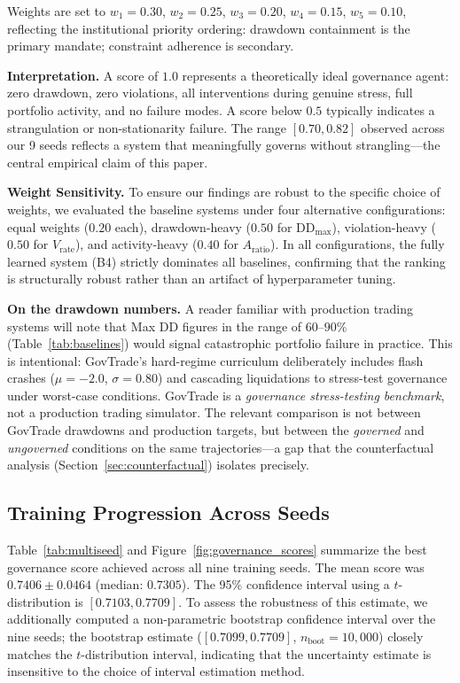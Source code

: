 \documentclass[11pt]{article}
\begin{document}
Weights are set to $w_1 = 0.30$, $w_2 = 0.25$, $w_3 = 0.20$, $w_4 = 0.15$, $w_5 = 0.10$, reflecting the institutional priority ordering: drawdown containment is the primary mandate; constraint adherence is secondary.

\textbf{Interpretation.} A score of $1.0$ represents a theoretically ideal governance agent: zero drawdown, zero violations, all interventions during genuine stress, full portfolio activity, and no failure modes. A score below $0.5$ typically indicates a strangulation or non-stationarity failure. The range $[0.70, 0.82]$ observed across our 9 seeds reflects a system that meaningfully governs without strangling---the central empirical claim of this paper.

\textbf{Weight Sensitivity.} To ensure our findings are robust to the specific choice of weights, we evaluated the baseline systems under four alternative configurations: equal weights ($0.20$ each), drawdown-heavy ($0.50$ for $\text{DD}_{\max}$), violation-heavy ($0.50$ for $V_{\text{rate}}$), and activity-heavy ($0.40$ for $A_{\text{ratio}}$). In all configurations, the fully learned system (B4) strictly dominates all baselines, confirming that the ranking is structurally robust rather than an artifact of hyperparameter tuning.

\textbf{On the drawdown numbers.} A reader familiar with production trading systems will note that Max DD figures in the range of $60$--$90\%$ (Table~\ref{tab:baselines}) would signal catastrophic portfolio failure in practice. This is intentional: GovTrade's hard-regime curriculum deliberately includes flash crashes ($\mu = -2.0$, $\sigma = 0.80$) and cascading liquidations to stress-test governance under worst-case conditions. GovTrade is a \emph{governance stress-testing benchmark}, not a production trading simulator. The relevant comparison is not between GovTrade drawdowns and production targets, but between the \emph{governed} and \emph{ungoverned} conditions on the same trajectories---a gap that the counterfactual analysis (Section~\ref{sec:counterfactual}) isolates precisely.



\subsection{Training Progression Across Seeds}
\label{sec:seeds}

Table~\ref{tab:multiseed} and Figure~\ref{fig:governance_scores} summarize the best governance score achieved across all nine training seeds. The mean score was $0.7406 \pm 0.0464$ (median: $0.7305$). The 95\% confidence interval using a $t$-distribution is $[0.7103, 0.7709]$. To assess the robustness of this estimate, we additionally computed a non-parametric bootstrap confidence interval over the nine seeds; the bootstrap estimate ($[0.7099, 0.7709]$, $n_{\text{boot}}=10{,}000$) closely matches the $t$-distribution interval, indicating that the uncertainty estimate is insensitive to the choice of interval estimation method.
\end{document}
